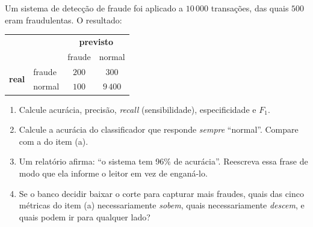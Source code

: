 \documentclass[11pt,a4paper]{article}
\begin{document}

\begin{exercicio}
Um sistema de detecção de fraude foi aplicado a $10\,000$ transações, das quais
$500$ eram fraudulentas. O resultado:
\begin{center}\small
\renewcommand{\arraystretch}{1.3}
\begin{tabular}{@{}ll cc@{}}
\toprule
 & & \multicolumn{2}{c}{\textbf{previsto}} \\
 & & fraude & normal \\
\midrule
\multirow{2}{*}{\textbf{real}} & fraude & $200$ & $300$ \\
                               & normal & $100$ & $9\,400$ \\
\bottomrule
\end{tabular}
\end{center}
\begin{enumerate}[label=(\alph*),leftmargin=1.1cm]
  \item Calcule acurácia, precisão, \emph{recall} (sensibilidade),
        especificidade e $F_1$.
  \item Calcule a acurácia do classificador que responde \emph{sempre}
        ``normal''. Compare com a do item (a).
  \item Um relatório afirma: ``o sistema tem 96\% de acurácia''. Reescreva essa
        frase de modo que ela informe o leitor em vez de enganá-lo.
  \item Se o banco decidir baixar o corte para capturar mais fraudes, quais das
        cinco métricas do item (a) necessariamente \emph{sobem}, quais
        necessariamente \emph{descem}, e quais podem ir para qualquer lado?
\end{enumerate}
\end{exercicio}
\end{document}
